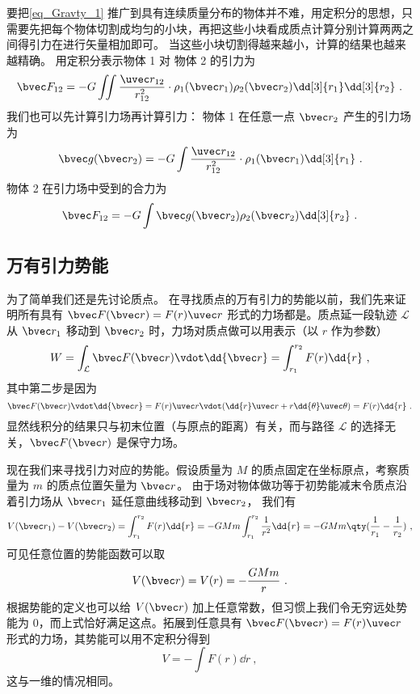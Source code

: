 要把\autoref{eq_Gravty_1} 推广到具有连续质量分布的物体并不难，用定积分的思想，只需要先把每个物体切割成均匀的小块，再把这些小块看成质点计算分别计算两两之间得引力在进行矢量相加即可。 当这些小块切割得越来越小，计算的结果也越来越精确。 用定积分表示物体 1 对 物体 2 的引力为
\begin{equation}
\bvec F_{12} = -G\iint \frac{\uvec r_{12}}{r_{12}^2}  \cdot \rho_1(\bvec r_1) \rho_2(\bvec r_2) \dd[3]{r_1} \dd[3]{r_2}~.
\end{equation}
我们也可以先计算引力场再计算引力： 物体 1 在任意一点 $\bvec r_2$ 产生的引力场为
\begin{equation}\label{eq_Gravty_4}
\bvec g(\bvec r_2) = -G\int \frac{\uvec r_{12}}{r_{12}^2}  \cdot \rho_1(\bvec r_1) \dd[3]{r_1}~.
\end{equation}
物体 2 在引力场中受到的合力为
\begin{equation}
\bvec F_{12} = -G\int \bvec g(\bvec r_2)\rho_2(\bvec r_2) \dd[3]{r_2}~.
\end{equation}

\subsection{万有引力势能}

为了简单我们还是先讨论质点。 在寻找质点的万有引力的势能以前，我们先来证明所有具有 $\bvec F(\bvec r) = F(r) \uvec r$ 形式的力场都是。质点延一段轨迹 $\mathcal{L}$ 从 $\bvec r_1$ 移动到 $\bvec r_2$ 时，力场对质点做可以用表示（以 $r$ 作为参数）
\begin{equation}\label{eq_Gravty_3}
W = \int_\mathcal{L} \bvec F(\bvec r) \vdot \dd{\bvec r} = \int_{r_1}^{r_2} F(r) \dd{r}~,
\end{equation}
其中第二步是因为
\begin{equation}
\bvec F(\bvec r) \vdot \dd{\bvec r} = F(r)\uvec  r \vdot (\dd{r} \uvec  r + r\dd{\theta} \uvec \theta ) = F(r) \dd{r}~.
\end{equation}
显然线积分的结果只与初末位置（与原点的距离）有关，而与路径 $\mathcal{L}$ 的选择无关，$\bvec F(\bvec r)$ 是保守力场。

现在我们来寻找引力对应的势能。假设质量为 $M$ 的质点固定在坐标原点，考察质量为 $m$ 的质点位置矢量为 $\bvec r$。 由于场对物体做功等于初势能减末令质点沿着引力场从 ${\bvec r_1}$ 延任意曲线移动到 $\bvec r_2$， 我们有
\begin{equation}
V(\bvec r_1) - V(\bvec r_2) = \int_{r_1}^{r_2} F(r) \dd{r} =  - GMm\int_{r_1}^{r_2} \frac{1}{r^2} \dd{r}  =  - GMm \qty( \frac{1}{r_1} - \frac{1}{r_2} )~,
\end{equation}
可见任意位置的势能函数可以取
\begin{equation}
V(\bvec r) = V(r) = - \frac{GMm}{r}~.
\end{equation}
根据势能的定义也可以给 $V(\bvec r)$ 加上任意常数，但习惯上我们令无穷远处势能为 0，而上式恰好满足这点。拓展到任意具有 $\bvec F(\bvec r) = F(r)\uvec r$ 形式的力场，其势能可以用不定积分得到
\begin{equation}\label{eq_Gravty_7}
V = -\int F(r) \dd{r}~,
\end{equation}
这与一维的情况相同。%

